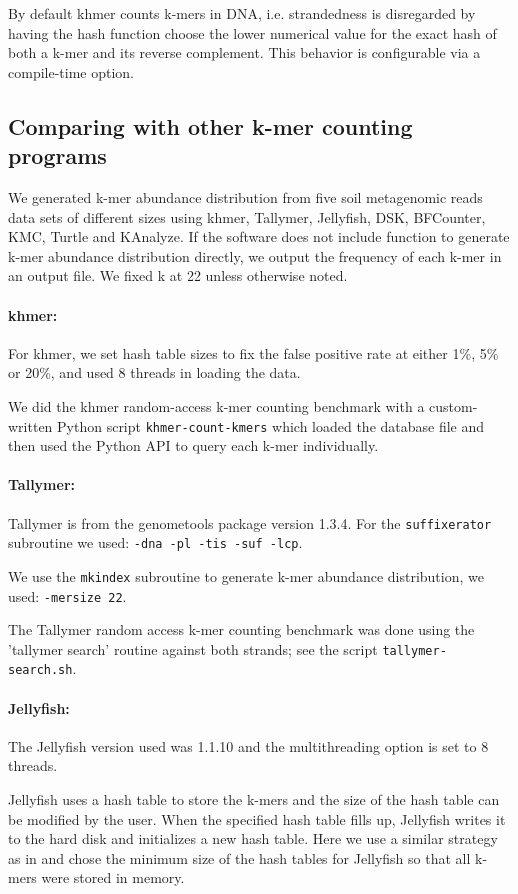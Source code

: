 \documentclass[10pt]{article}
\begin{document}
By default khmer counts k-mers in DNA, i.e. strandedness is
disregarded by having the hash function choose the lower numerical
value for the exact hash of both a k-mer and its reverse complement.
This behavior is configurable via a compile-time option.

\subsection*{Comparing with other k-mer counting programs}

We generated k-mer abundance distribution from five soil metagenomic reads
data sets of different sizes using khmer, Tallymer, Jellyfish, DSK, BFCounter, 
KMC, Turtle and KAnalyze. If the software 
does not include function to generate k-mer abundance distribution directly, we output the
frequency of each k-mer in an output file.
We fixed k at 22 unless otherwise noted.

\paragraph{khmer:}
For khmer, we set hash table sizes to fix the false positive rate at
either 1\%, 5\% or 20\%, and used 8 threads in loading the data.

We did the khmer random-access k-mer counting benchmark with a
custom-written Python script {\tt khmer-count-kmers} which loaded the
database file and then used the Python API to query each k-mer
individually.

\paragraph{Tallymer:}
Tallymer is from the genometools package version 1.3.4. For the {\tt suffixerator} subroutine 
we used:
{\tt -dna -pl -tis -suf -lcp}.

We use the {\tt mkindex} subroutine to generate k-mer abundance distribution, we used:
{\tt -mersize 22}.

The Tallymer random access k-mer counting benchmark was done using the
'tallymer search' routine against both strands; see the script
{\tt tallymer-search.sh}.

\paragraph{Jellyfish:}
The Jellyfish version used was 1.1.10 and the multithreading option is set to 8 threads.

Jellyfish uses a hash table to store the k-mers and the size of the
hash table can be modified by the user.  When the specified hash table
fills up, Jellyfish writes it to the hard
disk and initializes a new hash table.  Here we use a
similar strategy as in \cite{Melsted2011} and chose the minimum size of the hash 
tables for Jellyfish so that all k-mers were stored in memory.
\end{document}
